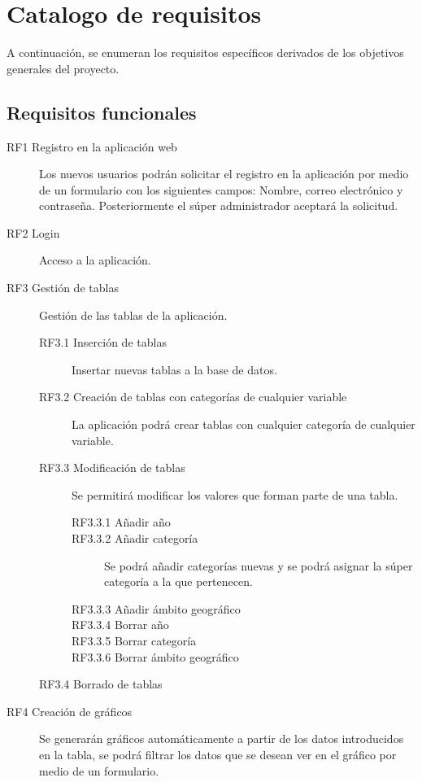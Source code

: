 \section{Catalogo de requisitos}
A continuación, se enumeran los requisitos específicos derivados de los objetivos generales del proyecto.
\subsection{Requisitos funcionales}
\begin{description}
    \item [RF1 Registro en la aplicación web] Los nuevos usuarios podrán solicitar el registro en la aplicación por medio de un formulario con los siguientes campos: Nombre, correo electrónico y contraseña. Posteriormente el súper administrador aceptará la solicitud.
    \item [RF2 Login] Acceso a la aplicación.
    \item [RF3 Gestión de tablas] Gestión de las tablas de la aplicación.
    \begin{description}
        \item [RF3.1 Inserción de tablas] Insertar nuevas tablas a la base de datos.
        \item [RF3.2 Creación de tablas con categorías de cualquier variable] La aplicación podrá crear tablas con cualquier categoría de cualquier variable.
        \item [RF3.3 Modificación de tablas] Se permitirá modificar los valores que forman parte de una tabla.
        \begin{description}
            \item [RF3.3.1 Añadir año]
            \item [RF3.3.2 Añadir categoría] Se podrá añadir categorías nuevas y se podrá asignar la súper categoría a la que pertenecen.
            \item [RF3.3.3 Añadir ámbito geográfico] 
            \item [RF3.3.4 Borrar año]
            \item [RF3.3.5 Borrar categoría]
            \item [RF3.3.6 Borrar ámbito geográfico]
        \end{description}
        \item [RF3.4 Borrado de tablas]
    \end{description}
    \item [RF4 Creación de gráficos] Se generarán gráficos automáticamente a partir de los datos introducidos en la tabla, se podrá filtrar los datos que se desean ver en el gráfico por medio de un formulario.

\end{description}
